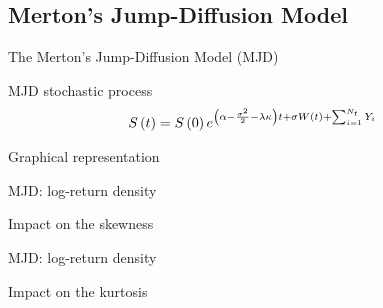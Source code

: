 \documentclass{beamer}
\newcommand{\Bm}{W\left(t\right)}
\newcommand{\St}{S\left(t\right)}
\begin{document}
\subsection{Merton's Jump-Diffusion Model}
\begin{frame}{The Merton's Jump-Diffusion Model (MJD)}

\begin{block}{MJD stochastic process}
  \begin{align}
  \St &= S\left(0\right) e^{\left(\alpha - \frac{\sigma^2}{2} - \lambda \kappa\right) t + \sigma \Bm + \sum_{i=1}^{N_t} Y_i}
  \notag
\end{align}
  
\end{block}


\begin{block}{Graphical representation}
  \begin{figure}[ht]
  \centering
   
\end{figure}
  
\end{block}
 
\end{frame}


\begin{frame}{MJD: log-return density}

\begin{block}{Impact on the skewness}
\begin{figure}[h]
\centering

\end{figure}
\end{block}
\end{frame}

\begin{frame}{MJD: log-return density}
\begin{block}{Impact on the kurtosis}
\begin{figure}[h]
\centering

\end{figure}
\end{block}
 
\end{frame}
\end{document}
